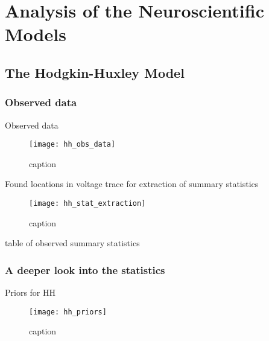 \chapter{Analysis of the Neuroscientific Models}

\section{The Hodgkin-Huxley Model}

\subsection{Observed data}

Observed data 

\begin{figure}[H]
    \centering
    \texttt{[image: hh\_obs\_data]}
    \caption{caption}
    \label{fig:fig1}
\end{figure} 

Found locations in voltage trace for extraction of summary statistics 

\begin{figure}[H]
    \centering
    \texttt{[image: hh\_stat\_extraction]}
    \caption{caption}
    \label{fig:fig1}
\end{figure} 

table of observed summary statistics 


\subsection{A deeper look into the statistics}

Priors for HH

\begin{figure}[H]
    \centering
    \texttt{[image: hh\_priors]}
    \caption{caption}
    \label{fig:fig1}
\end{figure} 



